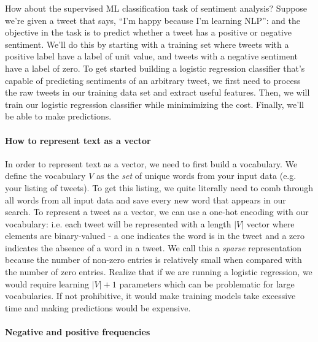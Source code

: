 \documentclass[12pt]{article}
\begin{document}
How about the supervised ML classification task of sentiment analysis? Suppose we're given a tweet that says, ``I'm happy because I'm learning NLP'': and the objective in the task is to predict whether a tweet has a positive or negative sentiment. We'll do this by starting with a training set where tweets with a positive label have a label of unit value, and tweets with a negative sentiment have a label of zero.
To get started building a logistic regression classifier that's capable of predicting sentiments of an arbitrary tweet, we first need to process the raw tweets in our training data set and extract useful features. Then, we will train our logistic regression classifier while minimimizing the cost. Finally, we'll be able to make predictions.

\paragraph{How to represent text as a vector} In order to represent text as a vector, we need to first build a vocabulary. We define the vocabulary $V$ as the \emph{set} of unique words from your input data (e.g. your listing of tweets). To get this listing, we quite literally need to comb through all words from all input data and save every new word that appears in our search.
To represent a tweet as a vector, we can use a one-hot encoding with our vocabulary: i.e. each tweet will be represented with a length $|V|$ vector where elements are binary-valued - a one indicates the word is in the tweet and a zero indicates the absence of a word in a tweet. We call this a \emph{sparse} representation because the number of non-zero entries is relatively small when compared with the number of zero entries. Realize that if we are running a logistic regression, we would require learning $|V| + 1$ parameters which can be problematic for large vocabularies. If not prohibitive, it would make training models take excessive time and making predictions would be expensive.

\paragraph{Negative and positive frequencies}
\end{document}
